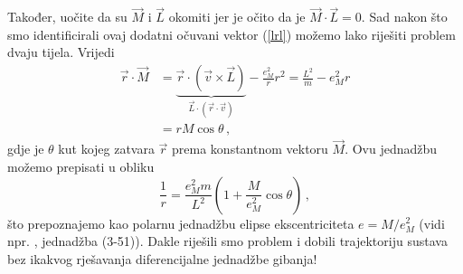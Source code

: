 Također, uočite da su $\vec{M}$ i $\vec{L}$ okomiti jer je očito da je
$\vec{M}\cdot\vec{L}=0$.
Sad nakon što smo identificirali ovaj
dodatni očuvani vektor (\ref{lrl}) možemo lako riješiti problem
dvaju tijela. Vrijedi
\begin{equation}
\begin{split}
 \vec{r}\cdot\vec{M} &= \underbrace{\vec{r}\cdot(\vec{v}\times\vec{L})}_{
\vec{L}\cdot(\vec{r}\cdot\vec{v})} - \frac{e_{M}^2}{r} r^2
= \frac{L^2}{m} - e_{M}^2 r \\
&= r M \cos \theta \,,
\end{split}
\end{equation}
gdje je $\theta$ kut kojeg zatvara $\vec{r}$ prema konstantnom vektoru
$\vec{M}$. Ovu jednadžbu možemo prepisati u obliku
\begin{equation}
\frac{1}{r} = \frac{e_{M}^2 m}{L^2} \left(1+\frac{M}{e_{M}^2} \cos\theta\right) \,,
\end{equation}
što prepoznajemo kao polarnu jednadžbu elipse ekscentriciteta $e=M/e_{M}^2$
(vidi npr. \cite{Goldstein:1980}, jednadžba (3-51)). Dakle riješili smo problem i
dobili trajektoriju sustava bez ikakvog rješavanja diferencijalne
jednadžbe gibanja!

